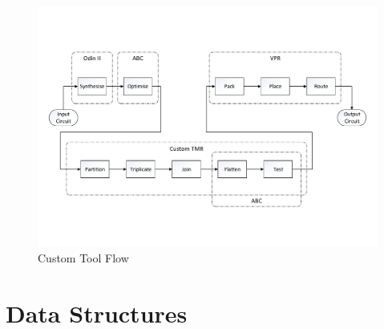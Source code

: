 \documentclass[12pt,final,oneside]{dwThesis} %
\begin{document}
   \begin{figure}
      \begin{center}
         \includegraphics[width=\linewidth]{images/CadFlowWPartitioner.pdf}
         \caption{Custom Tool Flow}
         \label{algToolflow}
      \end{center}
   \end{figure}
   

   \section{Data Structures}\label{secDatastructures}
\end{document}
